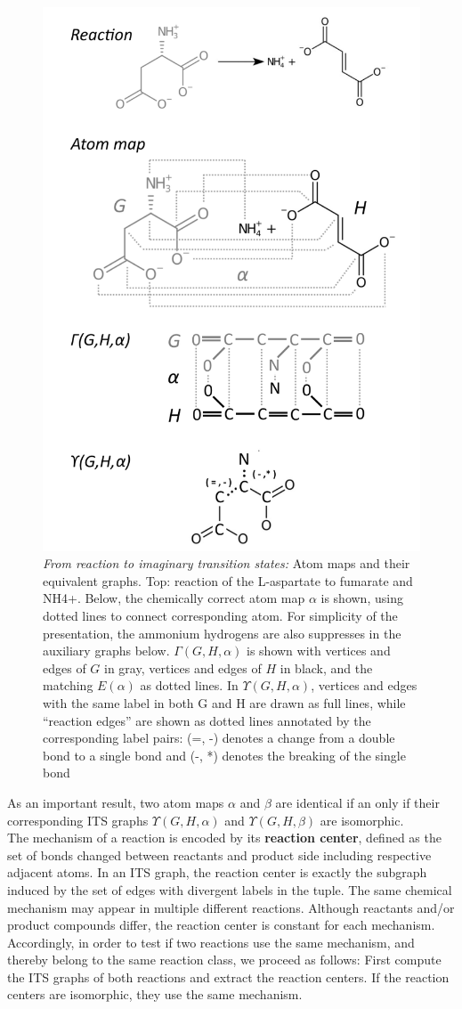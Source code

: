\documentclass[a4,12pt]{article}
\theoremstyle{plain}
\numberwithin{theorem}{section}
\begin{document}
\begin{figure}[htp]
  \centering
  \includegraphics[width=0.6\linewidth]{images/ITS_example.png}
  \caption{\emph{From reaction to imaginary transition states:}
  Atom maps and their equivalent graphs. Top: reaction of
  the L-aspartate to fumarate and NH4+. Below,
  the chemically correct atom map $\alpha$ is shown, using dotted
  lines to connect corresponding atom. For simplicity of the
  presentation, the ammonium hydrogens are also suppresses
  in the auxiliary graphs below. $\Gamma (G, H, \alpha)$ is shown
  with vertices and edges of $G$ in gray, vertices and edges of $H$ in black,
  and the matching $E(\alpha)$ as dotted lines. In $\Upsilon(G, H, \alpha)$,
  vertices and edges with the same label in both G and H are
  drawn as full lines, while ``reaction edges'' are shown as dotted lines
  annotated by the corresponding label pairs: (=, -)
  denotes a change from a double bond to a single bond and
  (-, *) denotes the breaking of the single bond}
  \label{fig:its}
\end{figure}

As an important result, two atom maps $\alpha$ and $\beta$ are identical if an only if their corresponding ITS graphs $\Upsilon(G, H, \alpha)$ and $\Upsilon(G, H, \beta)$ are isomorphic. \\

The mechanism of a reaction is encoded by its \textbf{reaction center}, defined as the set of bonds changed between reactants and product side including respective adjacent atoms.
In an ITS graph, the reaction center is exactly the subgraph induced by the set of edges with divergent labels in the tuple.
The same chemical mechanism may appear in multiple different reactions. Although reactants and/or product compounds differ, the reaction center is constant for each mechanism. Accordingly, in order to test if two reactions use the same mechanism, and thereby belong to the same reaction class, we proceed as follows: First compute the ITS graphs of both reactions and extract the reaction centers. If the reaction centers are isomorphic, they use the same mechanism.
\end{document}
